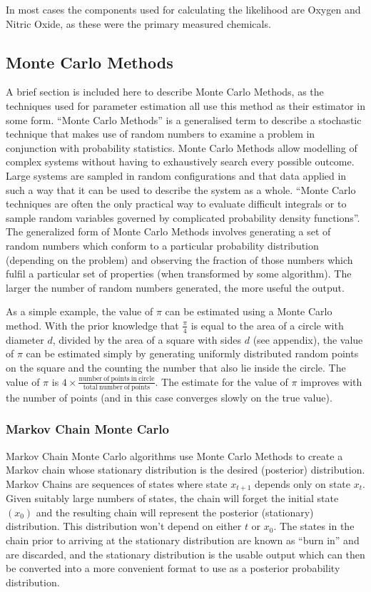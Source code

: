 In most cases the components used for calculating the likelihood are Oxygen and Nitric Oxide, as these were the primary measured chemicals.
\subsection{Monte Carlo Methods}
A brief section is included here to describe Monte Carlo Methods, as the techniques used for parameter estimation all use this method as their estimator in some form.
``Monte Carlo Methods'' is a generalised term to describe a stochastic technique that makes use of random numbers to examine a problem in conjunction with probability statistics. Monte Carlo Methods allow modelling of complex systems without having to exhaustively search every possible outcome. Large systems are sampled in random configurations and that data applied in such a way that it can be used to describe the system as a whole. ``Monte Carlo techniques are often the only practical way to evaluate difficult integrals or to sample random variables governed by complicated probability density functions''\cite{Nakamura2010}. The generalized form of Monte Carlo Methods involves generating a set of random numbers which conform to a particular probability distribution (depending on the problem) and observing the fraction of those numbers which fulfil a particular set of properties (when transformed by some algorithm). The larger the number of random numbers generated, the more useful the output.

As a simple example, the value of $\pi$ can be estimated using a Monte Carlo method. With the prior knowledge that $\frac{\pi}{4}$ is equal to the area of a circle with diameter $d$, divided by the area of a square with sides $d$ (see appendix), the value of $\pi$ can be estimated simply by generating uniformly distributed random points on the square and the counting the number that also lie inside the circle. The value of $\pi$ is $4\times\frac{\mathrm{number~of~points~in~circle}}{\mathrm{total~number~of~points}}$. The estimate for the value of $\pi$ improves with the number of points (and in this case converges slowly on the true value).

\subsubsection{Markov Chain Monte Carlo}
Markov Chain Monte Carlo algorithms use Monte Carlo Methods to create a Markov chain whose stationary distribution is the desired (posterior) distribution. Markov Chains are sequences of states where state $x_{t+1}$ depends only on state $x_t$. Given suitably large numbers of states, the chain will forget the initial state $(x_0)$ and the resulting chain will represent the posterior (stationary) distribution. This distribution won't depend on either $t$ or $x_0$\cite{Gilks1996}. The states in the chain prior to arriving at the stationary distribution are known as ``burn in'' and are discarded, and the stationary distribution is the usable output which can then be converted into a more convenient format to use as a posterior probability distribution.

